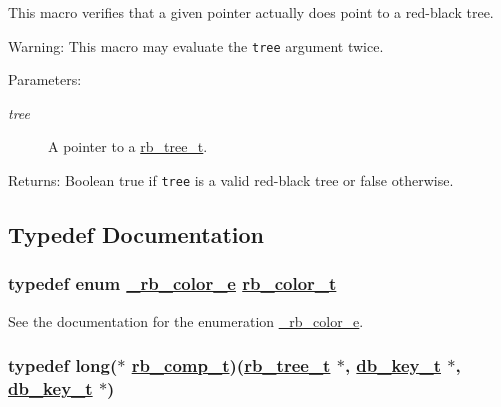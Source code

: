 This macro verifies that a given pointer actually does point to a red-black tree.

\begin{Desc}
\item[Warning:]This macro may evaluate the {\tt tree} argument twice.\end{Desc}
\begin{Desc}
\item[Parameters:]
\begin{description}
\item[{\em tree}]A pointer to a \hyperlink{group__dbprim__rbtree_a0}{rb\_\-tree\_\-t}.\end{description}
\end{Desc}
\begin{Desc}
\item[Returns:]Boolean true if {\tt tree} is a valid red-black tree or false otherwise. \end{Desc}


\subsection{Typedef Documentation}
\hypertarget{group__dbprim__rbtree_a4}{
\subsubsection[rb\_\-color\_\-t]{\setlength{\rightskip}{0pt plus 5cm}typedef enum \hyperlink{group__dbprim__rbtree_a38}{\_\-rb\_\-color\_\-e} \hyperlink{dbprim_8h_a4}{rb\_\-color\_\-t}}}
\label{group__dbprim__rbtree_a4}


See the documentation for the enumeration \hyperlink{group__dbprim__rbtree_a38}{\_\-rb\_\-color\_\-e}. \hypertarget{group__dbprim__rbtree_a3}{
\subsubsection[rb\_\-comp\_\-t]{\setlength{\rightskip}{0pt plus 5cm}typedef long($\ast$ \hyperlink{dbprim_8h_a3}{rb\_\-comp\_\-t})(\hyperlink{dbprim_8h_a0}{rb\_\-tree\_\-t} $\ast$, \hyperlink{dbprim_8h_a0}{db\_\-key\_\-t} $\ast$, \hyperlink{dbprim_8h_a0}{db\_\-key\_\-t} $\ast$)}}
\label{group__dbprim__rbtree_a3}


